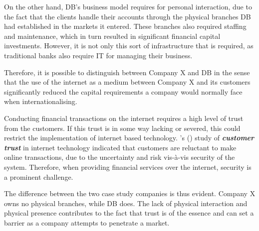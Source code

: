 \documentclass[11pt,a4paper]{article}
\begin{document}
{{{On the other hand, DB's business model requires for personal interaction, due to the fact that the clients handle their accounts through the physical branches DB had established in the markets it entered. These branches also required staffing and maintenance, which in turn resulted in significant financial capital investments. However, it is not only this sort of infrastructure that is required, as traditional banks also require IT for managing their business. \par
Therefore, it is possible to distinguish between Company X and DB in the sense that the use of the internet as a medium between Company X and its customers significantly reduced the capital requirements a company would normally face when internationalising. \par
Conducting financial transactions on the internet requires a high level of trust from the customers. If this trust is in some way lacking or severed, this could restrict the implementation of internet based technology. \citeauthor{leeTrustModelConsumer2001}'s (\citeyear{leeTrustModelConsumer2001}) study of \textbf{\textit{customer trust}} in internet technology indicated that customers are reluctant to make online transactions, due to the uncertainty and risk vis-à-vis security of the system. Therefore, when providing financial services over the internet, security is a prominent challenge. \par
The difference between the two case study companies is thus evident. Company X owns no physical branches, while DB does. The lack of physical interaction and physical presence contributes to the fact that trust is of the essence and can set a barrier as a company attempts to penetrate a market. \par

}}}
\end{document}
